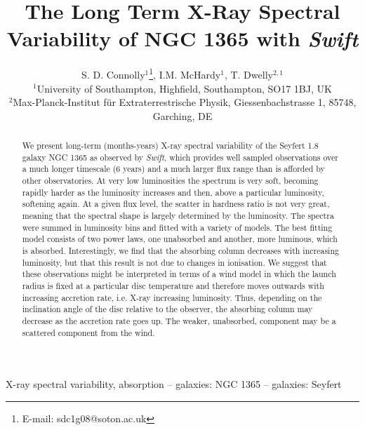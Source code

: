 \documentclass[useAMS,usenatbib]{sam}
\title[The Long Term X-Ray Spectral Variability of NGC 1365 with {\it Swift}]{The Long Term X-Ray Spectral Variability of NGC 1365 with {\it Swift}}
\author[S. D. Connolly, I.M. McHardy and T. Dwelly]{S. D. Connolly$^{1}$\thanks{E-mail: sdc1g08@soton.ac.uk}, I.M. McHardy$^{1}$, T. Dwelly$^{2,1}$ \\
$^{1}$University of Southampton, Highfield, Southampton, SO17 1BJ, UK\\
$^{2}$Max-Planck-Institut f\"{u}r Extraterrestrische Physik, Giessenbachstrasse 1, 85748, Garching, DE}
\begin{document}
\pagerange{\pageref{firstpage}--\pageref{lastpage}} 

\maketitle

\label{firstpage}


\begin{abstract}

We present long-term (months-years) X-ray spectral variability of the
Seyfert 1.8 galaxy NGC 1365 as observed by {\it Swift}, which provides
well sampled observations over a much longer timescale (6 years) and a
much larger flux range than is afforded by other observatories. At
very low luminosities the spectrum is very soft, becoming rapidly
harder as the luminosity increases and then, above a particular
luminosity, softening again.  At a given flux level, the scatter
in hardness ratio is not very great, meaning that the spectral shape is
largely determined by the luminosity.  The spectra were summed in
luminosity bins and fitted with a variety of models. The best fitting model
consists of two power laws, one unabsorbed and another, more luminous,
which is absorbed. Interestingly, we find that the absorbing column
decreases with increasing luminosity, but that this result is not due
to changes in ionisation. We suggest that these observations might be
interpreted in terms of a wind model in which the launch radius is
fixed at a particular disc temperature and therefore moves outwards with
increasing accretion rate, i.e. X-ray increasing luminosity. Thus, depending
on the inclination angle of the disc relative to the observer, the absorbing column may decrease
as the accretion rate goes up. The weaker, unabsorbed, component may
be a scattered component from the wind. 

\end{abstract}

\begin{keywords}
X-ray spectral variability, absorption – galaxies: NGC 1365 – galaxies: Seyfert
\end{keywords}

\end{document}
